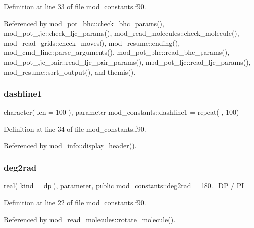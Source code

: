 Definition at line 33 of file mod\+\_\+constants.\+f90.



Referenced by mod\+\_\+pot\+\_\+bhc\+::check\+\_\+bhc\+\_\+params(), mod\+\_\+pot\+\_\+ljc\+::check\+\_\+ljc\+\_\+params(), mod\+\_\+read\+\_\+molecules\+::check\+\_\+molecule(), mod\+\_\+read\+\_\+grids\+::check\+\_\+moves(), mod\+\_\+resume\+::ending(), mod\+\_\+cmd\+\_\+line\+::parse\+\_\+arguments(), mod\+\_\+pot\+\_\+bhc\+::read\+\_\+bhc\+\_\+params(), mod\+\_\+pot\+\_\+ljc\+\_\+pair\+::read\+\_\+ljc\+\_\+pair\+\_\+params(), mod\+\_\+pot\+\_\+ljc\+::read\+\_\+ljc\+\_\+params(), mod\+\_\+resume\+::sort\+\_\+output(), and themis().

\mbox{\label{namespacemod__constants_ad292a8f1897875585bad7d5f454cf64a}} 
\subsubsection{\texorpdfstring{dashline1}{dashline1}}
{\footnotesize\ttfamily character( len = 100 ), parameter mod\+\_\+constants\+::dashline1 = repeat(\textquotesingle{}-\/\textquotesingle{}, 100)}



Definition at line 34 of file mod\+\_\+constants.\+f90.



Referenced by mod\+\_\+info\+::display\+\_\+header().

\mbox{\label{namespacemod__constants_a505a7c2ab1e1b2fa75db18a1d3e133b4}} 
\subsubsection{\texorpdfstring{deg2rad}{deg2rad}}
{\footnotesize\ttfamily real( kind = \hyperlink{namespacemod__constants_ac7aeda7f1802c4ef2a4780773c028214}{dp} ), parameter, public mod\+\_\+constants\+::deg2rad = 180.\+\_\+\+D\+P / PI}



Definition at line 22 of file mod\+\_\+constants.\+f90.



Referenced by mod\+\_\+read\+\_\+molecules\+::rotate\+\_\+molecule().

